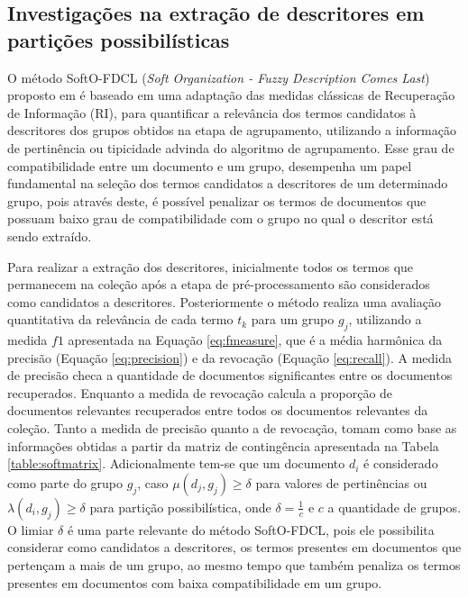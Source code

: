 \subsection{Investigações na extração de descritores em partições possibilísticas}
\label{sec:softofdcl}

O método SoftO-FDCL ({\it Soft Organization - Fuzzy Description Comes Last}) proposto em 
 é baseado em uma adaptação das medidas clássicas de Recuperação de
Informação (RI), para quantificar a relevância dos termos candidatos à descritores dos grupos
obtidos na etapa de agrupamento, utilizando a informação de pertinência ou tipicidade advinda do
algoritmo de agrupamento.  Esse grau de compatibilidade entre um documento e um grupo, desempenha um
papel fundamental na seleção dos termos candidatos a descritores de um determinado grupo, pois
através deste, é possível penalizar os termos de documentos que possuam baixo grau de
compatibilidade com o grupo no qual o descritor está sendo extraído.  

Para realizar a extração dos descritores, inicialmente todos os termos que permanecem na coleção
após a etapa de pré-processamento são considerados como candidatos a descritores. Posteriormente o
método realiza uma avaliação quantitativa da relevância de cada termo $t_k$ para um grupo $g_j$,
utilizando a medida $f1$ apresentada na Equação \ref{eq:fmeasure}, que é a média harmônica da
precisão (Equação \ref{eq:precision}) e da revocação (Equação \ref{eq:recall}).  A medida de
precisão checa a quantidade de documentos significantes entre os documentos recuperados. Enquanto a
medida de revocação calcula a proporção de documentos relevantes recuperados entre todos os
documentos relevantes da coleção. Tanto a medida de precisão quanto a de revocação, tomam como base
as informações obtidas a partir da matriz de contingência apresentada na Tabela
\ref{table:softmatrix}. Adicionalmente tem-se que um documento $d_i$ é considerado como parte do
grupo $g_j$, caso $\mu(d_j,g_j) \geq \delta$ para valores de pertinências ou $\lambda(d_i,g_j) \geq
\delta$ para partição possibilística, onde $\delta = \frac{1}{c}$ e $c$ a quantidade de grupos. O
limiar $\delta$ é uma parte relevante do método SoftO-FDCL, pois ele possibilita considerar como
candidatos a descritores, os termos presentes em documentos que pertençam a mais de um grupo, ao
mesmo tempo que também penaliza os termos presentes em documentos com baixa compatibilidade em um
grupo.

